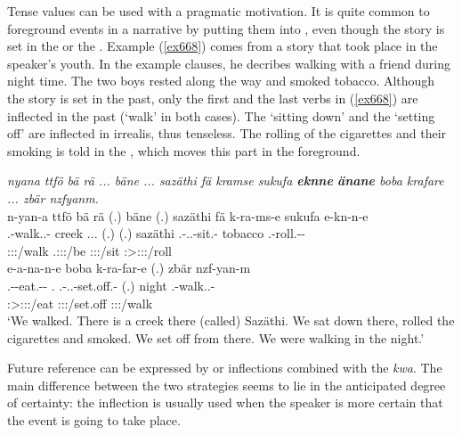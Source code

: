 Tense values can be used with a pragmatic motivation. It is quite common to foreground events in a narrative by putting them into , even though the story is set in the  or the . Example (\ref{ex668}) comes from a story that took place in the speaker's youth. In the example clauses, he decribes walking with a friend during night time. The two boys rested along the way and smoked tobacco. Although the story is set in the past, only the first and the last verbs in (\ref{ex668}) are inflected in the past  (`walk' in both cases). The `sitting down' and the `setting off' are inflected in irrealis, thus tenseless. The rolling of the cigarettes and their smoking is told in the , which moves this part in the foreground.

\begin{exe}
	\ex \emph{nyana ttfö bä rä ... bäne ... sazäthi fä kramse sukufa \textbf{eknne} \textbf{änane} boba krafare ... zbär nzfyanm.}\\
	\glll n-yan-a ttfö bä rä (.) bäne (.) sazäthi fä k-ra-ms-e sukufa e-kn-n-e\\
	\Fnsg.\Alph-walk.\Ext.\Du-\Pst{} creek \Med{} \Tsg.\F.\Cop.\Ndu{} (.) \Recog{} (.) sazäthi \Dist{} \Med.\Bet-\Irr.\Vc.\Du-sit.\Rs-\Fnsg{} tobacco \Stnsg.\Alph-roll.\Ext-\Du-\Fnsg{}\\
	\footnotesize{\Fdu:\Sbj:\Pst:\Ipfv/walk} {} {} \footnotesize{\Tsg.\F:\Sbj:\Nonpast:\Ipfv/be} {} {} {} {} {} \footnotesize{\Fdu:\Sbj:\Irr:\Pfv/sit} {} \footnotesize{\Fdu:\Sbj>\Stpl:\Obj:\Nonpast:\Ipfv/roll}\\
	\sn
	\glll e-a-na-n-e boba k-ra-far-e (.) zbär nzf-yan-m\\
	\Stnsg.\Alph-\Vc-eat.\Ext-\Du-\Fnsg{} \Med.\Abl{} \Med.\Alph-\Irr.\Vc.\Du-set.off.\Rs-\Fnsg{} (.) night \Fnsg.\Betatwo-walk.\Ext.\Du-\Dur{}\\
	\footnotesize{\Fdu:\Sbj>\Stpl:\Obj:\Nonpast:\Ipfv/eat} {} \footnotesize{\Fdu:\Sbj:\Irr:\Pfv/set.off} {} {} \footnotesize{\Fdu:\Sbj:\Pst:\Dur/walk}\\
	\trans `We walked. There is a creek there (called) Sazäthi. We sat down there, rolled the cigarettes and smoked. We set off from there. We were walking in the night.' 
	\label{ex668}
\end{exe}

Future reference can be expressed by  or  inflections combined with the   \emph{kwa}. The main difference between the two strategies seems to lie in the anticipated degree of certainty: the  inflection is usually used when the speaker is more certain that the event is going to take place.

